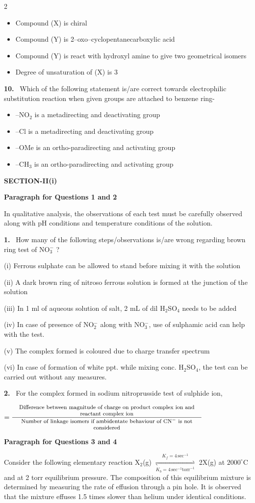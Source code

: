 \documentclass[10pt]{extarticle}
\newcommand{\sect}[1]{\par\smallskip\noindent\textbf{#1}\par}
\newcommand{\qn}[1]{\par\smallskip\noindent\textbf{#1.}~}
\newcommand{\paraq}[2]{\par\smallskip\noindent\textbf{Paragraph for Questions #1 and #2}\par}
\newenvironment{qoptions}{\begin{itemize}[leftmargin=1.8em,itemsep=1pt,topsep=2pt,label={}]}{\end{itemize}}
\newcommand{\opt}[2]{\item[(#1)] #2}
\let\oldsect\sect\let\oldparaq\paraq
\renewcommand{\sect}[1]{\Needspace{7\baselineskip}\oldsect{#1}\nopagebreak[4]}
\renewcommand{\paraq}[2]{\Needspace{6\baselineskip}\oldparaq{#1}{#2}\nopagebreak[4]}
\begin{document}
\begin{multicols}{2}
\begin{qoptions}
\opt{A}{Compound (X) is chiral}
\opt{B}{Compound (Y) is 2--oxo--cyclopentanecarboxylic acid}
\opt{C}{Compound (Y) is react with hydroxyl amine to give two geometrical isomers}
\opt{D}{Degree of unsaturation of (X) is 3}
\end{qoptions}
\qn{10} Which of the following statement is/are correct towards electrophilic substitution reaction when given groups are attached to benzene ring-
\begin{qoptions}
\opt{A}{--NO$_2$ is a metadirecting and deactivating group}
\opt{B}{--Cl is a metadirecting and deactivating group}
\opt{C}{--OMe is an ortho-paradirecting and activating group}
\opt{D}{--CH$_3$ is an ortho-paradirecting and activating group}
\end{qoptions}
\sect{SECTION-II(i)}
\paraq{1}{2}
In qualitative analysis, the observations of each test must be carefully observed along with pH conditions and temperature conditions of the solution.
\qn{1} How many of the following steps/observations is/are wrong regarding brown ring test of NO$_3^-$ ?\par
(i) Ferrous sulphate can be allowed to stand before mixing it with the solution\par
(ii) A dark brown ring of nitroso ferrous solution is formed at the junction of the solution\par
(iii) In 1 ml of aqueous solution of salt, 2 mL of dil H$_2$SO$_4$ needs to be added\par
(iv) In case of presence of NO$_2^-$ along with NO$_3^-$, use of sulphamic acid can help with the test.\par
(v) The complex formed is coloured due to charge transfer spectrum\par
(vi) In case of formation of white ppt. while mixing conc. H$_2$SO$_4$, the test can be carried out without any measures.
\qn{2} For the complex formed in sodium nitroprusside test of sulphide ion,\par
\par\noindent\hspace*{0.5em}$=\dfrac{\parbox{0.8\linewidth}{\centering\footnotesize Difference between magnitude of charge on product complex ion and reactant complex ion}}{\parbox{0.8\linewidth}{\centering\footnotesize Number of linkage isomers if ambidentate behaviour of CN$^-$ is not considered}}$
\paraq{3}{4}
Consider the following elementary reaction X$_2$(g) $\underset{K_b=4\,\text{sec}^{-1}\text{torr}^{-1}}{\overset{K_f=4\,\text{sec}^{-1}}{\rightleftharpoons}}$ 2X(g) at $2000^\circ$C and at 2 torr equilibrium pressure. The composition of this equilibrium mixture is determined by measuring the rate of effusion through a pin hole. It is observed that the mixture effuses 1.5 times slower than helium under identical conditions.

\end{multicols}
\end{document}
